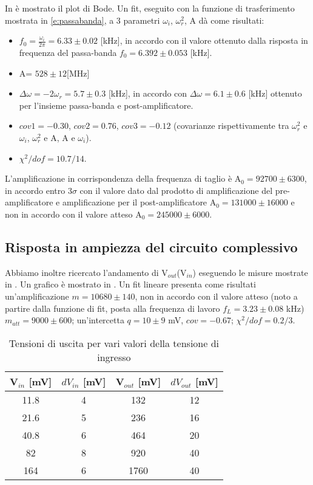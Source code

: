 In  è mostrato il plot di Bode. Un fit, eseguito con la funzione di trasferimento mostrata in \ref{e:passabanda}, a 3 parametri $\omega_i$, $\omega_r^2$, A dà come risultati:
\begin{itemize}
\item $f_0=\frac{\omega_i}{2\pi}= 6.33 \pm 0.02$ [kHz], in accordo con il valore ottenuto dalla risposta in frequenza del passa-banda $f_0 = 6.392 \pm 0.053$ [kHz].
\item A= $528 \pm 12$[MHz]
\item $\Delta \omega =-2\omega_r=  5.7 \pm 0.3$ [kHz], in accordo con $\Delta \omega = 6.1 \pm 0.6$ [kHz] ottenuto per l'insieme passa-banda e post-amplificatore.
\item $cov1 = -0.30$, $cov2 = 0.76$, $cov3 = -0.12$ (covarianze rispettivamente tra $\omega_r^2$ e $\omega_i$, $\omega_r^2$ e A, A e $\omega_i$).
\item $\chi^2/dof = 10.7/14$.
\end{itemize}
L'amplificazione in corrispondenza della frequenza di taglio è A$_0 = 92700 \pm 6300$, in accordo entro 3$\sigma$ con il valore dato dal prodotto di amplificazione del pre-amplificatore e amplificazione per il post-amplificatore A$_0 = 131000 \pm 16000$ e non in accordo con il valore atteso A$_0 = 245000 \pm 6000$.

\subsection{Risposta in ampiezza del circuito complessivo}
Abbiamo inoltre ricercato l'andamento di V$_{out}$(V$_{in}$) eseguendo le misure mostrate in . Un grafico è mostrato in . Un fit lineare presenta come risultati un'amplificazione $m = 10680 \pm 140$, non in accordo con il valore atteso (noto a partire dalla funzione di fit, posta alla frequenza di lavoro $f_L = 3.23 \pm 0.08$ kHz) $m_{att} = 9000 \pm 600$; un'intercetta $q = 10 \pm 9$ mV, $cov = -0.67$; $\chi^2 /dof = 0.2/3$.
\begin{table}[h]
	\centering
	\begin{tabular}{cccc}		
		 {V$_{in}$ [mV]} & {$dV_{in}$ [mV]} & {V$_{out}$ [mV]} & {$dV_{out}$ [mV]} \\
		 \midrule
                       11.8 & 4 & 132 & 12 \\
                       21.6 & 5 & 236 & 16 \\
                       40.8 & 6 & 464 & 20 \\
                       82 & 8 & 920 &40 \\
                       164 & 6 & 1760 & 40 \\
 	\end{tabular}
	\caption{Tensioni di uscita per vari valori della tensione di ingresso}
	\label{t:risposta_ampiezza}
\end{table}

